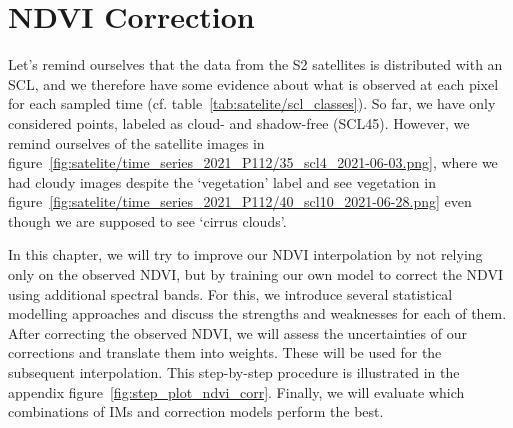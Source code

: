 \chapter{NDVI Correction} \label{sec:corr}

{
    Let's remind ourselves that the data from the S2 satellites is distributed  with an SCL, and we therefore have some evidence about what is observed at each pixel for each sampled time (cf. table~\ref{tab:satelite/scl_classes}). So far, we have only considered points, labeled as cloud- and shadow-free (SCL45). However, we remind ourselves of the satellite images in figure~\ref{fig:satelite/time_series_2021_P112/35_scl4_2021-06-03.png}, where we had cloudy images despite the `vegetation' label and see vegetation in figure~\ref{fig:satelite/time_series_2021_P112/40_scl10_2021-06-28.png} even though we are supposed to see `cirrus clouds'.
    


    
    In this chapter, we will try to improve our NDVI interpolation by not relying only on the observed NDVI, but by training our own model to correct the NDVI using additional spectral bands. For this, we introduce several statistical modelling approaches and discuss the strengths and weaknesses for each of them. After correcting the observed NDVI, we will assess the uncertainties of our corrections and translate them into weights. These will be used for the subsequent interpolation. This step-by-step procedure is illustrated in the appendix figure~\ref{fig:step_plot_ndvi_corr}. Finally, we will evaluate which combinations of {{IM}}s and correction models perform the best.
}

